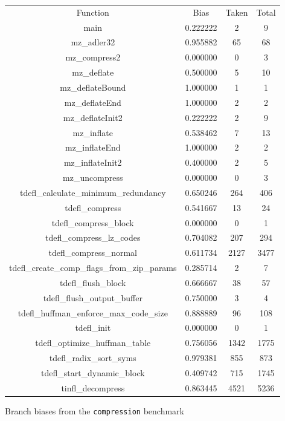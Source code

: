 \documentclass[12pt]{article}
\begin{document}
\begin{figure*}[!t]
\begin{center}
\begin{tabular} { |c|c|c|c| }
\hline
	Function & Bias & Taken & Total \\
	main & 0.222222 & 2  & 9 \\
	mz\_adler32 & 0.955882 &  65  & 68 \\
	mz\_compress2 & 0.000000  & 0 & 3 \\
	mz\_deflate & 0.500000  & 5 & 10 \\ 
	mz\_deflateBound & 1.000000 & 1 & 1\\
	mz\_deflateEnd & 1.000000 & 2  &  2 \\
	mz\_deflateInit2  & 0.222222 & 2  & 9 \\
	mz\_inflate & 0.538462 & 7 &13 \\
	mz\_inflateEnd & 1.000000 & 2 & 2 \\
	mz\_inflateInit2 & 0.400000 & 2 & 5 \\
	mz\_uncompress & 0.000000 & 0 & 3 \\
	tdefl\_calculate\_minimum\_redundancy & 0.650246 & 264 & 406 \\
	tdefl\_compress  & 0.541667 & 13  & 24 \\
	tdefl\_compress\_block & 0.000000 & 0  & 1 \\
	tdefl\_compress\_lz\_codes & 0.704082 & 207& 294 \\
	tdefl\_compress\_normal & 0.611734 & 2127 & 3477 \\
	tdefl\_create\_comp\_flags\_from\_zip\_params & 0.285714 & 2 & 7 \\
	tdefl\_flush\_block & 0.666667 & 38 & 57 \\
	tdefl\_flush\_output\_buffer & 0.750000 & 3 & 4 \\
	tdefl\_huffman\_enforce\_max\_code\_size & 0.888889 & 96 &108 \\
	tdefl\_init & 0.000000 & 0 & 1 \\
	tdefl\_optimize\_huffman\_table & 0.756056 & 1342 & 1775 \\
	tdefl\_radix\_sort\_syms  & 0.979381 & 855  & 873 \\
	tdefl\_start\_dynamic\_block &  0.409742 & 715 &  1745 \\
	tinfl\_decompress  & 0.863445 & 4521 & 5236 \\
\hline
\end{tabular}
\caption{Branch biases from the {\tt compression} benchmark}
\label{BRANCH}
\end{center}
\end{figure*}
\end{document}
